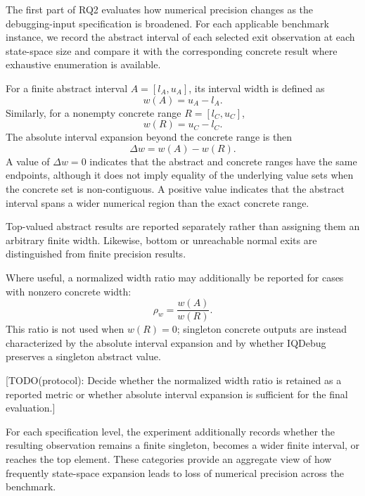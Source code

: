 \documentclass[11pt,oneside]{report}
\theoremstyle{plain}
\theoremstyle{definition}
\theoremstyle{remark}
\begin{document}
The first part of RQ2 evaluates how numerical precision changes as the debugging-input specification is broadened. For each applicable benchmark instance, we record the abstract interval of each selected exit observation at each state-space size and compare it with the corresponding concrete result where exhaustive enumeration is available.

For a finite abstract interval \(A=[l_A,u_A]\), its interval width is defined as
\[
w(A)=u_A-l_A.
\]
Similarly, for a nonempty concrete range \(R=[l_C,u_C]\),
\[
w(R)=u_C-l_C.
\]
The absolute interval expansion beyond the concrete range is then
\[
\Delta w
=
w(A)-w(R).
\]
A value of \(\Delta w=0\) indicates that the abstract and concrete ranges have the same endpoints, although it does not imply equality of the underlying value sets when the concrete set is non-contiguous. A positive value indicates that the abstract interval spans a wider numerical region than the exact concrete range.

Top-valued abstract results are reported separately rather than assigning them an arbitrary finite width. Likewise, bottom or unreachable normal exits are distinguished from finite precision results.

Where useful, a normalized width ratio may additionally be reported for cases with nonzero concrete width:
\[
\rho_w
=
\frac{w(A)}{w(R)}.
\]
This ratio is not used when \(w(R)=0\); singleton concrete outputs are instead characterized by the absolute interval expansion and by whether IQDebug preserves a singleton abstract value.

[TODO(protocol): Decide whether the normalized width ratio is retained as a reported metric or whether absolute interval expansion is sufficient for the final evaluation.]

For each specification level, the experiment additionally records whether the resulting observation remains a finite singleton, becomes a wider finite interval, or reaches the top element. These categories provide an aggregate view of how frequently state-space expansion leads to loss of numerical precision across the benchmark.
\end{document}
